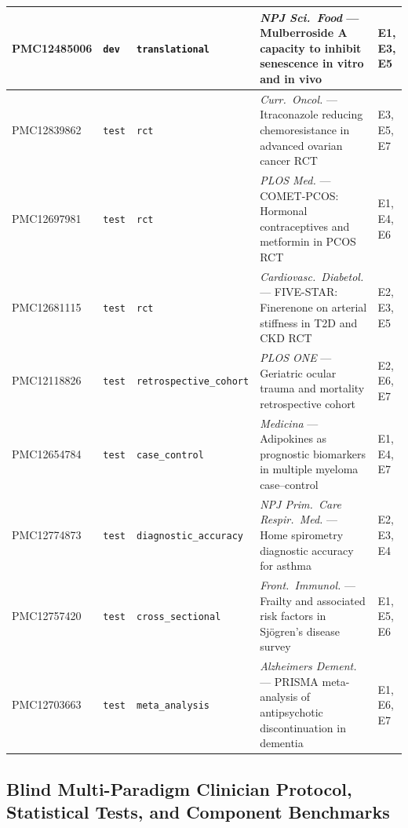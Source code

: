 \documentclass[11pt,a4paper]{article}
\begin{document}
\begin{table}[!t]
\begin{tabularx}{\textwidth}{@{}>{\ttfamily}l l l >{\raggedright\arraybackslash}X l@{}}
PMC12485006 & \texttt{dev} & \texttt{translational} & \emph{NPJ Sci.\ Food} --- Mulberroside A capacity to inhibit senescence in vitro and in vivo & E1, E3, E5 \\
\midrule
PMC12839862 & \texttt{test} & \texttt{rct} & \emph{Curr.\ Oncol.} --- Itraconazole reducing chemoresistance in advanced ovarian cancer RCT & E3, E5, E7 \\
PMC12697981 & \texttt{test} & \texttt{rct} & \emph{PLOS Med.} --- COMET-PCOS: Hormonal contraceptives and metformin in PCOS RCT & E1, E4, E6 \\
PMC12681115 & \texttt{test} & \texttt{rct} & \emph{Cardiovasc.\ Diabetol.} --- FIVE-STAR: Finerenone on arterial stiffness in T2D and CKD RCT & E2, E3, E5 \\
PMC12118826 & \texttt{test} & \texttt{retrospective\_cohort} & \emph{PLOS ONE} --- Geriatric ocular trauma and mortality retrospective cohort & E2, E6, E7 \\
PMC12654784 & \texttt{test} & \texttt{case\_control} & \emph{Medicina} --- Adipokines as prognostic biomarkers in multiple myeloma case--control & E1, E4, E7 \\
PMC12774873 & \texttt{test} & \texttt{diagnostic\_accuracy} & \emph{NPJ Prim.\ Care Respir.\ Med.} --- Home spirometry diagnostic accuracy for asthma & E2, E3, E4 \\
PMC12757420 & \texttt{test} & \texttt{cross\_sectional} & \emph{Front.\ Immunol.} --- Frailty and associated risk factors in Sj\"ogren's disease survey & E1, E5, E6 \\
PMC12703663 & \texttt{test} & \texttt{meta\_analysis} & \emph{Alzheimers Dement.} --- PRISMA meta-analysis of antipsychotic discontinuation in dementia & E1, E6, E7 \\
\bottomrule
\end{tabularx}
\end{table}

\subsection{Blind Multi-Paradigm Clinician Protocol, Statistical Tests, and Component Benchmarks}
\label{sec:simulated_clinician}
\end{document}
